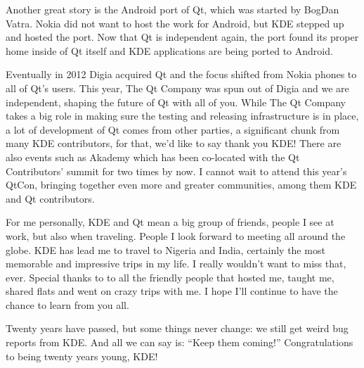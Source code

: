 Another great story is the Android port of Qt, which was started by BogDan Vatra. Nokia did not want to host the work for Android, but KDE stepped up and hosted the port. Now that Qt is independent again, the port found its proper home inside of Qt itself and KDE applications are being ported to Android.

Eventually in 2012 Digia acquired Qt and the focus shifted from Nokia phones to all of Qt's users. This year, The Qt Company was spun out of Digia and we are independent, shaping the future of Qt with all of you. While The Qt Company takes a big role in making sure the testing and releasing infrastructure is in place, a lot of development of Qt comes from other parties, a significant chunk from many KDE contributors, for that, we'd like to say thank you KDE! There are also events such as Akademy which has been co-located with the Qt Contributors' summit for two times by now. I cannot wait to attend this year's QtCon, bringing together even more and greater communities, among them KDE and Qt contributors.

For me personally, KDE and Qt mean a big group of friends, people I see at work, but also when traveling. People I look forward to meeting all around the globe. KDE has lead me to travel to Nigeria and India, certainly the most memorable and impressive trips in my life. I really wouldn't want to miss that, ever. Special thanks to to all the friendly people that hosted me, taught me, shared flats and went on crazy trips with me. I hope I'll continue to have the chance to learn from you all.

Twenty years have passed, but some things never change: we still get weird bug reports from KDE. And all we can say is: “Keep them coming!” Congratulations to being twenty years young, KDE!
